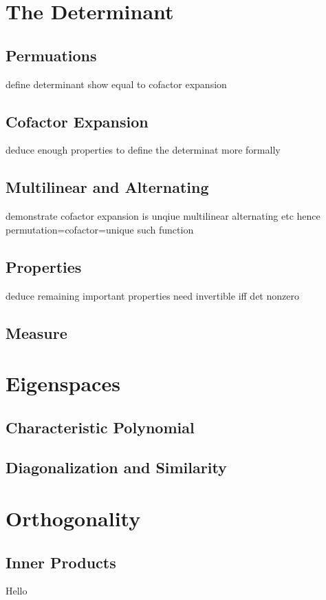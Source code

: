 \documentclass[oneside, 12pt]{book}
\theoremstyle{definition}
\begin{document}
\chapter{The Determinant}
\section{Permuations}
define determinant
show equal to cofactor expansion
\section{Cofactor Expansion}
deduce enough properties to define the determinat more formally
\section{Multilinear and Alternating}
demonstrate cofactor expansion is unqiue multilinear alternating etc
hence permutation=cofactor=unique such function
\section{Properties}
deduce remaining important properties
need invertible iff det nonzero
\section{Measure}
\chapter{Eigenspaces}
\section{Characteristic Polynomial}
\section{Diagonalization and Similarity}
\chapter{Orthogonality}
\section{Inner Products}
Hello
\end{document}
